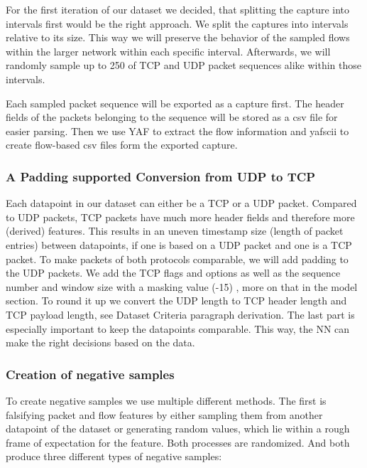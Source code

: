 \documentclass[
	ngerman,
	ruledheaders=section,%
	class=report,%
	thesis={type=bachelor},%
	accentcolor=9c,%
	custommargins=true,%
	marginpar=false,%
	parskip=half-,%
	fontsize=11pt,%
]{tudapub}
\begin{document}
For the first iteration of our dataset we decided, that splitting the capture into intervals first would be the right approach.
We split the captures into intervals relative to its size.
This way we will preserve the behavior of the sampled flows within the larger network within each specific interval.
Afterwards, we will randomly sample up to 250 of TCP and UDP packet sequences alike within those intervals.

Each sampled packet sequence will be exported as a capture first.
The header fields of the packets belonging to the sequence will be stored as a csv file for easier parsing.
Then we use YAF to extract the flow information and yafscii to create flow-based csv files form the exported capture.

\subsubsection{A Padding supported Conversion from UDP to TCP}

Each datapoint in our dataset can either be a TCP or a UDP packet.
Compared to UDP packets, TCP packets have much more header fields and therefore more (derived) features.
This results in an uneven timestamp size (length of packet entries) between datapoints, if one is based on a UDP packet and one is a TCP packet.
To make packets of both protocols comparable, we will add padding to the UDP packets.
We add the TCP flags and options as well as the sequence number and window size with a masking value (-15) , more on that in the model section.
To round it up we convert the UDP length to TCP header length and TCP payload length, see Dataset Criteria paragraph derivation.
The last part is especially important to keep the datapoints comparable.
This way, the NN can make the right decisions based on the data.

\subsubsection{Creation of negative samples}

To create negative samples we use multiple different methods.
The first is falsifying packet and flow features by either sampling them from another datapoint of the dataset or generating random values, which lie within a rough frame of expectation for the feature.
Both processes are randomized.
And both produce three different types of negative samples:
\end{document}
